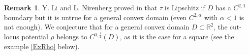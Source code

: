 \documentclass[reqno,11pt]{amsart}
\theoremstyle{definition}
\newtheorem{remark}[theorem]{Remark}
\numberwithin{equation}{section}
\def\e{\varepsilon}
\def\ov{\overline}
\def\R{\mathbb{R}}
\newcommand{\1}{{{\bf 1}\kern-0,28em\rm l}}
\newcommand{\dis}{\displaystyle}
\def\proj{\Pi}
\newcommand{\red}[1]{{\color{red}#1}}
\begin{document}
 
 
 
%







 \begin{remark}
Y. Li and L. Nirenberg proved in \cite{li2005distance} that $\tau$ is Lipschitz if $D$ has a $C^{2,1}$ boundary but 
it is untrue for a general convex domain  (even  $C^{2,\alpha}$ with $\alpha<1$ is not enough).
We conjecture that for a general convex domain $D\subset \R^2$, the cut-locus potential $\rho$ belongs to $C^{0,\frac1{2}}(D)$, as it is the case for a square (see  the example \ref{ExRho} below).
\end{remark}
\end{document}
